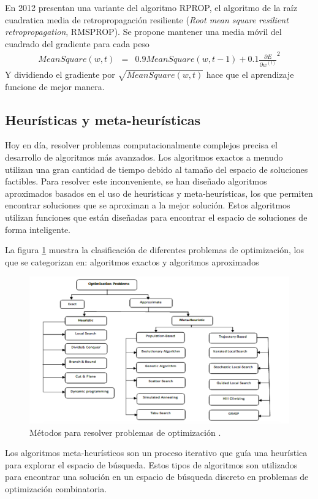 En 2012  presentan una variante del algoritmo RPROP, el algoritmo de la raíz cuadratica media de retropropagación resiliente ({\em Root mean square resilient retropropagation}, RMSPROP). Se propone mantener una media móvil del cuadrado del gradiente para cada peso
\begin{eqnarray}
	MeanSquare(w, t) &=& 0.9MeanSquare(w, t - 1) + 0.1\frac{\partial E}{\partial w^{(t)}}^{2}
\end{eqnarray}
Y dividiendo el gradiente por $\sqrt{MeanSquare(w, t)}$ hace que el aprendizaje funcione de mejor manera.


\subsection{Heurísticas y meta-heurísticas}
Hoy en día, resolver problemas computacionalmente complejos precisa el desarrollo de algoritmos más avanzados. Los algoritmos exactos a menudo utilizan una gran cantidad de tiempo debido al tamaño del espacio de soluciones factibles. Para resolver este inconveniente, se han diseñado algoritmos aproximados basados en el uso de heurísticas y meta-heurísticas, los que permiten encontrar soluciones que se aproximan a la mejor solución. Estos algoritmos utilizan funciones que están diseñadas para encontrar el espacio de soluciones de forma inteligente.

La figura \ref{fig:tax_opt} muestra la clasificación de diferentes problemas de optimización, los que se categorizan en: algoritmos exactos y algoritmos aproximados \cite{Desale2015}
\begin{figure}[H]
    \centering
    \includegraphics[scale=0.2]{img/tax_opt.png}
    \caption{Métodos para resolver problemas de optimización \protect\cite{Desale2015}.}
		\label{fig:tax_opt}
\end{figure}
Los algoritmos meta-heurísticos son un proceso iterativo que guía una heurística para explorar el espacio de búsqueda. Estos tipos de algoritmos son utilizados para encontrar una solución en un espacio de búsqueda discreto en problemas de optimización combinatoria.

